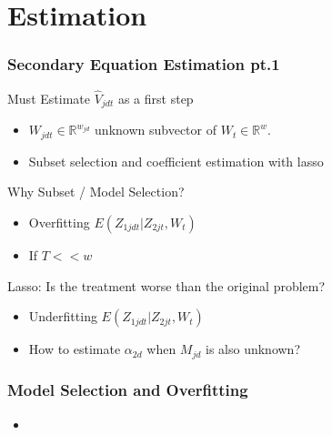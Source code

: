 \documentclass[9pt]{beamer}
\begin{document}
\section{Estimation}
\begin{frame} 
\frametitle{Secondary Equation Estimation pt.1 } 


Must Estimate $\hat{V}_{jdt}$ as a first step \\
\begin{itemize} \addtolength{\itemsep}{\baselineskip}
    \item $W_{jdt} \in \mathbb{R}^{w_{jd}}$ unknown subvector of $W_t \in \mathbb{R}^w$. 
    \item Subset selection and coefficient estimation with lasso
\end{itemize}




\vspace{0.5cm}
Why Subset / Model Selection? \\

\begin{itemize} \addtolength{\itemsep}{\baselineskip}

	\item Overfitting $E(Z_{1jdt} | Z_{2jt},W_{t})$ 
       
       \item If $T<< w$

\end{itemize} 
\vspace{0.5cm}
 Lasso: Is the treatment worse than the original problem? \\

\begin{itemize} \addtolength{\itemsep}{\baselineskip}

	\item Underfitting $E(Z_{1jdt} | Z_{2jt},W_{t})$ 
       
      \item How to estimate $\alpha_{2d}$ when $M_{jd}$ is also unknown?

\end{itemize} 



\end{frame}


\begin{frame} 
\frametitle{Model Selection and Overfitting} 

\begin{itemize} 
	\item 
\end{itemize} 

\end{frame}
\end{document}
